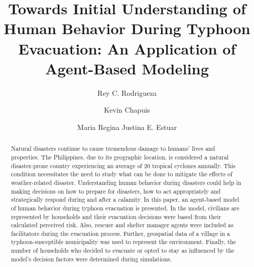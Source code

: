 \documentclass[runningheads]{llncs}
\begin{document}
%
\title{Towards Initial Understanding of Human Behavior During Typhoon Evacuation: An Application of Agent-Based Modeling} %

%
%
\author{Rey C. Rodrigueza \and
Kevin Chapuis \and
Maria Regina Justina E. Estuar}
%
%
%
\maketitle              %
%
\begin{abstract}
Natural disasters continue to cause tremendous damage to humans' lives and properties. The Philippines, due to its geographic location, is considered a natural disaster-prone country experiencing an average of 20 tropical cyclones annually. This condition necessitates the need to study what can be done to mitigate the effects of weather-related disaster. Understanding human behavior during disasters could help in making decisions on how to prepare for disasters, how to act appropriately and strategically respond during and after a calamity. In this paper, an agent-based model of human behavior during typhoon evacuation is presented. In the model, civilians are represented by households and their evacuation decisions were based from their calculated perceived risk. Also, rescuer and shelter manager agents were included as facilitators during the evacuation process. Further, geospatial data of a village in a typhoon-susceptible municipality was used to represent the environment. Finally, the number of households who decided to evacuate or opted to stay as influenced by the model’s decision factors were determined during simulations.

\end{abstract}
%
%
%
\end{document}
